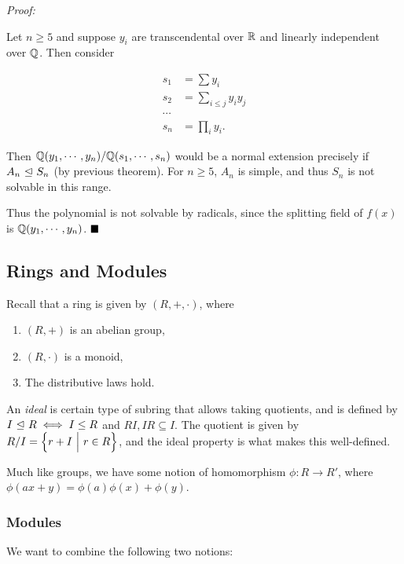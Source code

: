 \emph{Proof:}

Let \(n\geq 5\) and suppose \(y_i\) are transcendental over \({\mathbb{R}}\) and
linearly independent over \({\mathbb{Q}}\). Then consider

\begin{align*}
s_1 &= \sum y_i \\
s_2 &= \sum_{i\leq j} y_i y_j \\
\cdots \\
s_n &= \prod_i y_i
.\end{align*}

Then \({\mathbb{Q}}(y_1, \cdots, y_n)/ {\mathbb{Q}}(s_1, \cdots, s_n)\) would be a normal
extension precisely if \(A_n {~\trianglelefteq~} S_n\) (by previous theorem). For
\(n\geq 5\), \(A_n\) is simple, and thus \(S_n\) is not solvable in this
range.

Thus the polynomial is not solvable by radicals, since the splitting
field of \(f(x)\) is \({\mathbb{Q}}(y_1, \cdots, y_n)\). \(\qed\)

\hypertarget{rings-and-modules}{%
\subsection{Rings and Modules}\label{rings-and-modules}}

Recall that a ring is given by \((R, +, \cdot)\), where

\begin{enumerate}
\def\labelenumi{\arabic{enumi}.}
\tightlist
\item
  \((R, +)\) is an abelian group,
\item
  \((R, \cdot)\) is a monoid,
\item
  The distributive laws hold.
\end{enumerate}

An \emph{ideal} is certain type of subring that allows taking quotients,
and is defined by \(I {~\trianglelefteq~} R \iff I\leq R\) and
\(RI, IR \subseteq I\). The quotient is given by
\(R/I = \left\{{r + I {~\mathrel{\Big|}~} r\in R}\right\}\), and the ideal property is
what makes this well-defined.

Much like groups, we have some notion of homomorphism \(\phi: R\to R'\),
where \(\phi(ax+y) = \phi(a)\phi(x) + \phi(y)\).

\hypertarget{modules}{%
\subsubsection{Modules}\label{modules}}

We want to combine the following two notions:

